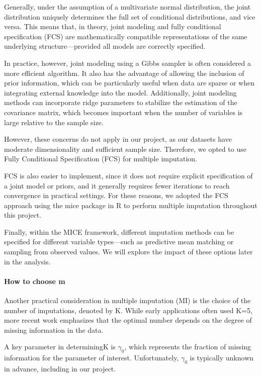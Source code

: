 \documentclass{article}
\begin{document}
Generally, under the assumption of a multivariate normal distribution,
the joint distribution uniquely determines the full set of conditional
distributions, and vice versa. This means that, in theory, joint
modeling and fully conditional specification (FCS) are mathematically
compatible representations of the same underlying structure---provided
all models are correctly specified.

In practice, however, joint modeling using a Gibbs sampler is often
considered a more efficient algorithm. It also has the advantage of
allowing the inclusion of prior information, which can be particularly
useful when data are sparse or when integrating external knowledge into
the model. Additionally, joint modeling methods can incorporate ridge
parameters to stabilize the estimation of the covariance matrix, which
becomes important when the number of variables is large relative to the
sample size.

However, these concerns do not apply in our project, as our datasets
have moderate dimensionality and sufficient sample size. Therefore, we
opted to use Fully Conditional Specification (FCS) for multiple
imputation.

FCS is also easier to implement, since it does not require explicit
specification of a joint model or priors, and it generally requires
fewer iterations to reach convergence in practical settings. For these
reasons, we adopted the FCS approach using the mice package in R to
perform multiple imputation throughout this project.

Finally, within the MICE framework, different imputation methods can be
specified for different variable types---such as predictive mean
matching or sampling from observed values. We will explore the impact of
these options later in the analysis.

\paragraph{How to choose m}\label{how-to-choose-m}

Another practical consideration in multiple imputation (MI) is the
choice of the number of imputations, denoted by K. While early
applications often used K=5, more recent work emphasizes that the
optimal number depends on the degree of missing information in the data.

A key parameter in determiningK is \(\gamma_{0}\), which represents the
fraction of missing information for the parameter of interest.
Unfortunately, \(\gamma_{0}\) is typically unknown in advance, including
in our project.
\end{document}
